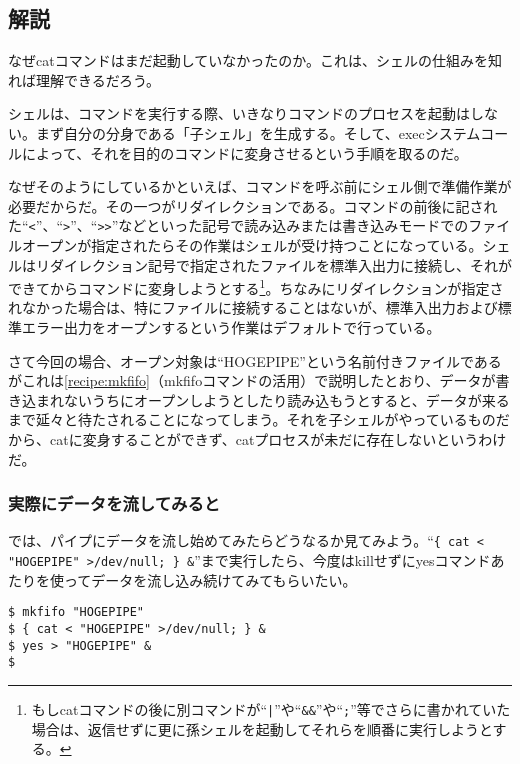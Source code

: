 \subsection*{解説}

なぜcatコマンドはまだ起動していなかったのか。これは、シェルの仕組みを知れば理解できるだろう。

シェルは、コマンドを実行する際、いきなりコマンドのプロセスを起動はしない。まず自分の分身である「子シェル」を生成する。そして、execシステムコールによって、それを目的のコマンドに変身させるという手順を取るのだ。

なぜそのようにしているかといえば、コマンドを呼ぶ前にシェル側で準備作業が必要だからだ。その一つがリダイレクションである。コマンドの前後に記された``\verb|<|''、``\verb|>|''、``\verb|>>|''などといった記号で読み込みまたは書き込みモードでのファイルオープンが指定されたらその作業はシェルが受け持つことになっている。シェルはリダイレクション記号で指定されたファイルを標準入出力に接続し、それができてからコマンドに変身しようとする\footnote{もしcatコマンドの後に別コマンドが``\verb!|!''や``\verb|&&|''や``\verb|;|''等でさらに書かれていた場合は、返信せずに更に孫シェルを起動してそれらを順番に実行しようとする。}。ちなみにリダイレクションが指定されなかった場合は、特にファイルに接続することはないが、標準入出力および標準エラー出力をオープンするという作業はデフォルトで行っている。

さて今回の場合、オープン対象は``HOGEPIPE''という名前付きファイルであるがこれは\ref{recipe:mkfifo}（mkfifoコマンドの活用）で説明したとおり、データが書き込まれないうちにオープンしようとしたり読み込もうとすると、データが来るまで延々と待たされることになってしまう。それを子シェルがやっているものだから、catに変身することができず、catプロセスが未だに存在しないというわけだ。

\subsubsection*{実際にデータを流してみると}

では、パイプにデータを流し始めてみたらどうなるか見てみよう。``\verb|{ cat < "HOGEPIPE" >/dev/null; } &|''まで実行したら、今度はkillせずにyesコマンドあたりを使ってデータを流し込み続けてみてもらいたい。

\begin{screen}
	\verb|$ mkfifo "HOGEPIPE"| \return \\
	\verb|$ { cat < "HOGEPIPE" >/dev/null; } &| \return \\
	\verb|$ yes > "HOGEPIPE" &| \return \\
	\verb|$ |
\end{screen}

